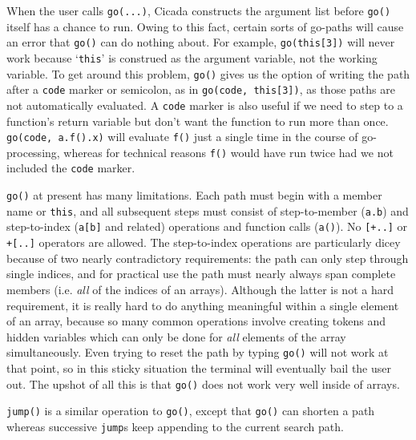 \documentclass{article}
\begin{document}
When the user calls \verb#go(...)#, Cicada constructs the argument list before \verb#go()# itself has a chance to run.  Owing to this fact, certain sorts of go-paths will cause an error that \verb#go()# can do nothing about.  For example, \verb#go(this[3])# will never work because `\verb#this#' is construed as the argument variable, not the working variable.  To get around this problem, \verb#go()# gives us the option of writing the path after a \verb#code# marker or semicolon, as in \verb#go(code, this[3])#, as those paths are not automatically evaluated.  A \verb#code# marker is also useful if we need to step to a function's return variable but don't want the function to run more than once.  \verb#go(code, a.f().x)# will evaluate \verb#f()# just a single time in the course of go-processing, whereas for technical reasons \verb#f()# would have run twice had we not included the \verb#code# marker.

\verb#go()# at present has many limitations.  Each path must begin with a member name or \verb#this#, and all subsequent steps must consist of step-to-member (\verb#a.b#) and step-to-index (\verb#a[b]# and related) operations and function calls (\verb#a()#).  No \verb#[+..]# or \verb#+[..]# operators are allowed.  The step-to-index operations are particularly dicey because of two nearly contradictory requirements:  the path can only step through single indices, and for practical use the path must nearly always span complete members (i.e. \emph{all} of the indices of an arrays).  Although the latter is not a hard requirement, it is really hard to do anything meaningful within a single element of an array, because so many common operations involve creating tokens and hidden variables which can only be done for \emph{all} elements of the array simultaneously.  Even trying to reset the path by typing \verb#go()# will not work at that point, so in this sticky situation the terminal will eventually bail the user out.  The upshot of all this is that \verb#go()# does not work very well inside of arrays.

\verb#jump()# is a similar operation to \verb#go()#, except that \verb#go()# can shorten a path whereas successive \verb#jump#s keep appending to the current search path.\\\\




\end{document}
